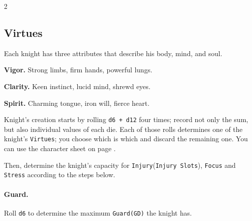 
\begin{multicols*}{2}

\subsection*{Virtues}

Each knight has three attributes that describe his body, mind, and soul.

\textbf{Vigor.}
Strong limbs, firm hands, powerful lungs.

\textbf{Clarity.}
Keen instinct, lucid mind, shrewd eyes.

\textbf{Spirit.}
Charming tongue, iron will, fierce heart.

Knight's creation starts by rolling \texttt{d6 + d12} four times; record not only the sum, but also individual values of each die.
Each of those rolls determines one of the knight's \texttt{Virtues}; you choose which is which and discard the remaining one. You can use the character sheet on page \pageref*{sec:ch_sheet}.

Then, determine the knight's capacity for \texttt{Injury}(\texttt{Injury Slots}), \texttt{Focus} and \texttt{Stress} according to the steps below.

\paragraph{Guard.} Roll \texttt{d6} to determine the maximum \texttt{Guard(GD)} the knight has.


\end{multicols*}
